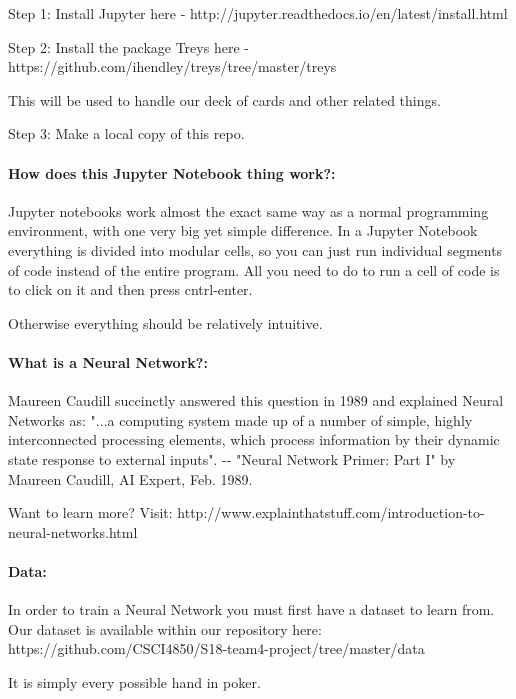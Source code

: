 \documentclass[11pt]{article}
\begin{document}
Step 1: Install Jupyter here -
http://jupyter.readthedocs.io/en/latest/install.html

Step 2: Install the package Treys here -
https://github.com/ihendley/treys/tree/master/treys

This will be used to handle our deck of cards and other related things.

Step 3: Make a local copy of this repo.

    \paragraph{How does this Jupyter Notebook thing
work?:}\label{how-does-this-jupyter-notebook-thing-work}

    Jupyter notebooks work almost the exact same way as a normal programming
environment, with one very big yet simple difference. In a Jupyter
Notebook everything is divided into modular cells, so you can just run
individual segments of code instead of the entire program. All you need
to do to run a cell of code is to click on it and then press
cntrl-enter.

Otherwise everything should be relatively intuitive.

    \paragraph{What is a Neural Network?:}\label{what-is-a-neural-network}

    Maureen Caudill succinctly answered this question in 1989 and explained
Neural Networks as: "...a computing system made up of a number of
simple, highly interconnected processing elements, which process
information by their dynamic state response to external inputs". -\/-
"Neural Network Primer: Part I" by Maureen Caudill, AI Expert, Feb.
1989.

Want to learn more? Visit:
http://www.explainthatstuff.com/introduction-to-neural-networks.html

    \paragraph{Data:}\label{data}

    In order to train a Neural Network you must first have a dataset to
learn from. Our dataset is available within our repository here:
https://github.com/CSCI4850/S18-team4-project/tree/master/data

It is simply every possible hand in poker.
\end{document}
